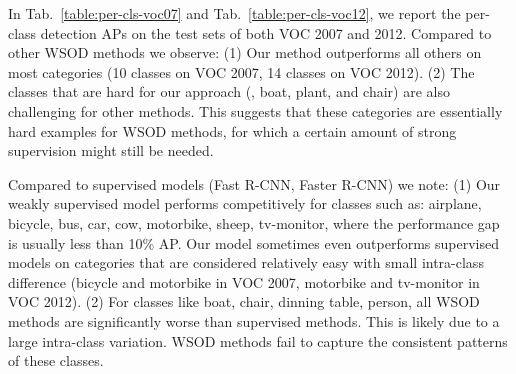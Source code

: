\documentclass[10pt,twocolumn,letterpaper]{article}
\begin{document}
In Tab.~\ref{table:per-cls-voc07} and Tab.~\ref{table:per-cls-voc12}, we report the per-class detection APs on the test sets of both VOC 2007 and 2012. Compared to other WSOD methods we observe: (1) Our method outperforms all others on most categories (10 classes on VOC 2007, 14 classes on VOC 2012). (2) The classes that are hard for our approach (\eg, boat, plant, and chair) are also challenging for other methods. This suggests that these categories are essentially hard examples for WSOD methods, for which a certain amount of strong supervision might still be needed.

Compared to supervised models (Fast R-CNN, Faster R-CNN) we note: (1) Our weakly supervised model performs competitively for classes such as: airplane, bicycle, bus, car, cow, motorbike, sheep, tv-monitor, where the performance gap is usually less than 10\% AP. Our model sometimes even outperforms supervised models on categories that are considered relatively easy with small intra-class difference (bicycle and motorbike in VOC 2007, motorbike and tv-monitor in VOC 2012). (2) For classes like boat, chair, dinning table, person, all WSOD methods are significantly worse than supervised methods. This is likely due to a large intra-class variation. WSOD methods fail to capture the consistent patterns of these classes.
\end{document}
